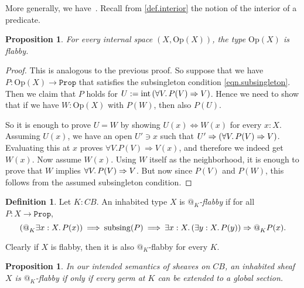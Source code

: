 \documentclass[11pt, oneside, article]{memoir}
\makeatletter
\theoremstyle{plain}
\newtheorem{proposition}[theorem]{Proposition}
\theoremstyle{definition}
\newtheorem{definition}[theorem]{Definition}
\theoremstyle{remark}
\DeclareMathOperator{\interior}{int}
\newcommand{\const}[1]{\mathtt{#1}}
\newcommand{\Set}[1]{\mathrm{#1}}
\newcommand{\subsing}[1]{\mathrm{subsing}(#1)}	%
\newcommand{\Prop}{\const{Prop}}
\newcommand{\Op}{\Set{Op}}
\newcommand{\BaseSpace}{B}
\newcommand{\CB}{C\BaseSpace}
\newcommand{\AtSymbol}{{@}}
\newcommand{\At}[2][]{\AtSymbol^{#1}_{#2}}
\newcommand{\imp}{\Rightarrow}
\makeatother
\begin{document}
More generally, we have~\cite[Lemma~1.2]{moerdijk}. 
Recall from \cref{def.interior} the notion of the interior of a predicate.


\begin{proposition}
	\label{prop:opens_flabby}
	For every internal space $(X,\Op(X))$, the type $\Op(X)$ is flabby.
\end{proposition}

\begin{proof}
This is analogous to the previous proof. So suppose that we have $P : \Op(X) \to \Prop$ that satisfies the subsingleton condition \cref{eqn.subsingleton}. Then we claim that $P$ holds for $U := \interior\left(\forall V \ldotp P(V) \imp V\right)$. Hence we need to show that if we have $W : \Op(X)$ with $P(W)$, then also $P(U)$.

	So it is enough to prove $U = W$ by showing $U(x) \Leftrightarrow W(x)$ for every $x : X$. Assuming $U(x)$, we have an open $U'\ni x$ such that $U' \imp (\forall V \ldotp P(V) \imp V)$. Evaluating this at $x$ proves $\forall V. P(V) \imp V(x)$, and therefore we indeed get $W(x)$. Now assume $W(x)$. Using $W$ itself as the neighborhood, it is enough to prove that $W$ implies $\forall V\ldotp P(V) \imp V$. But now since $P(V)$ and $P(W)$, this follows from the assumed subsingleton condition.
\end{proof}

\begin{definition}\label{def.at_flabby}
	Let $K : \CB$. An inhabited type $X$ is \emph{$\At{K}$-flabby} if for all $P : X \to \Prop$,
	\begin{equation}
		\label{eq.at_flabby}
		\left( \At{K} \exists x : X \ldotp P(x)\right) \: \Longrightarrow \: \subsing{P} \: \Longrightarrow \: \exists x : X \ldotp (\exists y : X \ldotp P(y)) \imp \At{K} P(x) .
	\end{equation}
\end{definition}

Clearly if $X$ is flabby, then it is also $\At{K}$-flabby for every $K$.

\begin{proposition}
	\label{prop.at_flabby_semantics}
	In our intended semantics of sheaves on $\CB$, an inhabited sheaf $X$ is $\At{K}$-flabby if only if every germ at $K$ can be extended to a global section.
\end{proposition}
\end{document}
